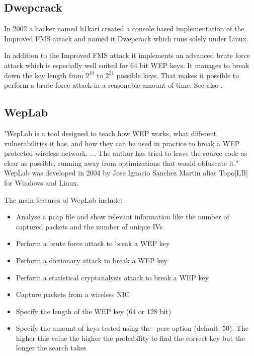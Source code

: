 \subsection*{Dwepcrack}

In 2002 a hacker named h1kari created a console based implementation of the Improved FMS attack and named it Dwepcrack which runs solely under Linux.

In addition to the Improved FMS attack it implements an advanced brute force attack which is especially well suited for 64 bit WEP keys. It manages to break down the key length from $2^{40}$ to $2^{21}$ possible keys. That makes it possible to perform a brute force attack in a reasonable amount of time. See also \cite{wep_dead_1}.

\subsection*{WepLab}

"WepLab is a tool designed to teach how WEP works, what different vulnerabilities it has, and how they can be used in practice to break a WEP protected wireless network. ... The author has tried to leave the source code as clear as possible, running away from optimizations that would obfuscate it." \cite{weplab} WepLab was developed in 2004 by Jose Ignacio Sanchez Martin alias Topo[LB] for Windows and Linux.

The main features of WepLab include:

\begin{itemize}
	\addtolength{\itemsep}{-1.5ex}

	\item Analyse a pcap file and show relevant information like the number of captured packets and the number of unique IVs
	\item Perform a brute force attack to break a WEP key
	\item Perform a dictionary attack to break a WEP key
	\item Perform a statistical cryptanalysis attack to break a WEP key
	\item Capture packets from a wireless NIC
	\item Specify the length of the WEP key (64 or 128 bit)
	\item Specify the amount of keys tested using the --perc option (default: 50). The higher this value the higher the probability to find the correct key but the longer the search takes
\end{itemize}

